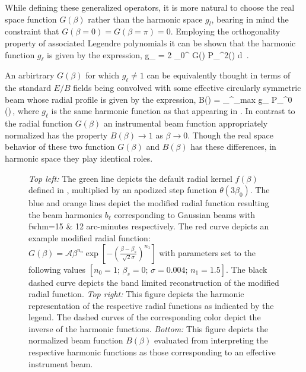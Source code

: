 While defining these generalized operators, it is more natural to choose the real space function $G(\beta)$ rather than the harmonic space $g_l$, bearing in mind the constraint that $G(\beta=0)=G(\beta=\pi)=0$. Employing the orthogonality property of associated Legendre polynomials it can be shown that the harmonic function $g_{\ell}$ is given by the expression,
%
\beq
g_{\ell} = 2 \pi {} \int _{0}^{\pi} G(\beta) P_{\ell}^{2}(\cos{\beta}) d\cos{\beta} \,. \label{eq:gb2bl}
\eeq
%


An arbirtrary $G(\beta)$ for which $g_{\ell} \neq 1$ can be equivalently thought in terms of the standard $E/B$ fields being convolved with some effective circularly symmetric beam whose radial profile is given by the expression,
%
\beq
B(\beta) = \sum_{}^{\ell_{\rm max}}  g_{\ell} P_{\ell}^{0} (\cos{\beta})\,,
\eeq
%
where $g_{\ell}$ is the same harmonic function as that appearing in .  
In contrast to the radial function $G(\beta)$ an instrumental beam function appropriately normalized has the property $B(\beta) \rightarrow 1$ as $\beta \rightarrow 0$. Though the real space behavior of these two function $G(\beta)$ and $B(\beta)$ has these differences, in harmonic space they play identical roles.
%
\begin{figure}[!t] 
\centering
{}
\caption{\textit{Top left:} The green line depicts the default radial kernel $f(\beta)$ defined in , multiplied by an apodized step function $\theta(3 \beta_0)$. The blue and orange lines depict the modified radial function resulting the beam harmonics $b_{\ell}$ corresponding to Gaussian beams with fwhm=15 \& 12 arc-minutes respectively. The red curve depicts an example modified radial function: $G(\beta)=\mathcal{A} \beta^{n_o} \exp{\left[ -\left( \frac{\beta-\beta_s}{\sqrt{2} \sigma} \right)^{n_1} \right]}$ with parameters set to the following values $[n_0=1;\, \beta_s=0 ;\, \sigma = 0.004 ;\, n_1=1.5]$. The black dashed curve depicts the band limited reconstruction of the modified radial function. \textit{Top right:} This figure depicts the harmonic representation of the respective radial functions as indicated by the legend. The dashed curves of the corresponding color depict the inverse of the harmonic functions. \textit{Bottom:} This figure depicts the normalized beam function $B(\beta)$ evaluated from interpreting the respective harmonic functions as those corresponding to an effective instrument beam.}
\label{fig:example_gbeta}
\end{figure}
%

